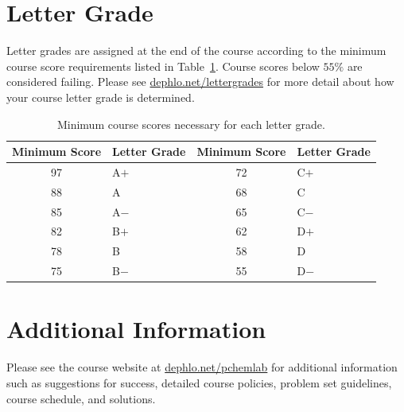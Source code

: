 \documentclass[letterpaper,oneside,onecolumn,11pt,article]{memoir}
\begin{document}
\section{Letter Grade}
Letter grades are assigned at the end of the course according to the minimum course score requirements listed in Table~\ref{tab:lettergrades}. Course scores below $55\%$ are considered failing. Please see \href{http://dephlo.net/lettergrades}{dephlo.net/lettergrades} for more detail about how your course letter grade is determined. 
\begin{table}[h]
\caption{\sffamily Minimum course scores necessary for each letter grade.}
\label{tab:lettergrades}
\begin{tabular}{cl||cl} \toprule
\textbf{Minimum Score} & \textbf{Letter Grade} & \textbf{Minimum Score} & \textbf{Letter Grade} \\ \hline
97 & \hspace{0.3in}A$+$ & 72 & \hspace{0.3in}C$+$ \\
88 & \hspace{0.3in}A & 68 & \hspace{0.3in}C \\
85 & \hspace{0.3in}A$-$ & 65 & \hspace{0.3in}C$-$ \\
82 & \hspace{0.3in}B$+$ & 62 & \hspace{0.3in}D$+$ \\
78 & \hspace{0.3in}B & 58 & \hspace{0.3in}D \\
75 & \hspace{0.3in}B$-$ & 55 & \hspace{0.3in}D$-$ \\
\bottomrule
\end{tabular}
\end{table}
%
%
\section{Additional Information}
Please see the course website at \href{http://dephlo.net/pchemlab}{dephlo.net/pchemlab} for additional information such as suggestions for success, detailed course policies, problem set guidelines, course schedule, and solutions. 
%
%
\end{document}

